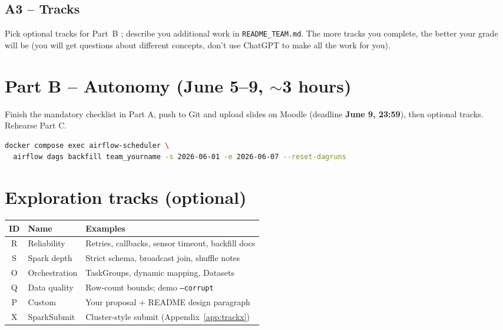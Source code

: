 \documentclass[11pt,a4paper]{article}
\begin{document}
\subsection*{A3 -- Tracks}

Pick optional tracks for Part~B ; describe you additional work in \texttt{README\_TEAM.md}. The more tracks you complete, the better your grade will be (you will get questions about different concepts, don't use ChatGPT to make all the work for you).

\section*{Part B -- Autonomy (June 5--9, \texorpdfstring{$\sim$}{~}3 hours)}
\label{sec:partb}

Finish the mandatory checklist in Part A, push to Git and upload slides on Moodle
(deadline \textbf{June 9, 23:59}), then optional tracks. Rehearse Part C.

\begin{lstlisting}[language=bash]
docker compose exec airflow-scheduler \
  airflow dags backfill team_yourname -s 2026-06-01 -e 2026-06-07 --reset-dagruns
\end{lstlisting}


\section*{Exploration tracks (optional)}
\label{sec:tracks}

\begin{center}
\small
\renewcommand{\arraystretch}{1.2}
\begin{tabular}{@{} c l p{9cm} @{}}
\toprule
\textbf{ID} & \textbf{Name} & \textbf{Examples} \\
\midrule
R & Reliability & Retries, callbacks, sensor timeout, backfill docs \\
S & Spark depth & Strict schema, broadcast join, shuffle notes \\
O & Orchestration & TaskGroups, dynamic mapping, Datasets \\
Q & Data quality & Row-count bounds; demo \texttt{--corrupt} \\
P & Custom & Your proposal + README design paragraph \\
X & SparkSubmit & Cluster-style submit (Appendix~\ref{app:trackx}) \\
\bottomrule
\end{tabular}
\end{center}
\end{document}
